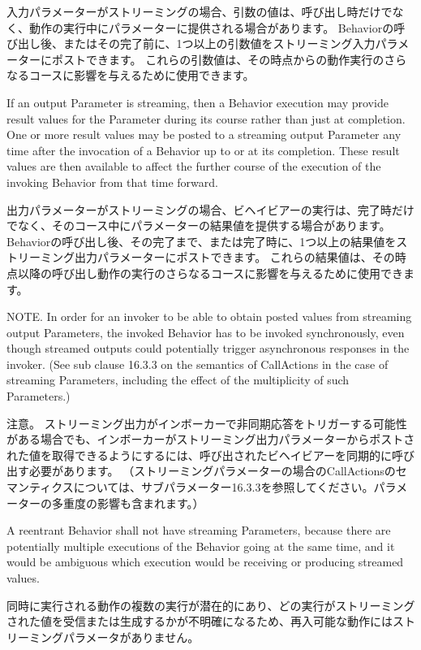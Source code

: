 \documentclass[a4paper,11pt]{ltjsarticle}
\begin{document}
入力パラメーターがストリーミングの場合、引数の値は、呼び出し時だけでなく、動作の実行中にパラメーターに提供される場合があります。
Behaviorの呼び出し後、またはその完了前に、1つ以上の引数値をストリーミング入力パラメーターにポストできます。 
これらの引数値は、その時点からの動作実行のさらなるコースに影響を与えるために使用できます。

If an output Parameter is streaming, then a Behavior execution may provide result values for the Parameter during its course rather than just at completion. 
One or more result values may be posted to a streaming output Parameter any time after the invocation of a Behavior up to or at its completion. 
These result values are then available to affect the further course of the execution of the invoking Behavior from that time forward.

出力パラメーターがストリーミングの場合、ビヘイビアーの実行は、完了時だけでなく、そのコース中にパラメーターの結果値を提供する場合があります。
Behaviorの呼び出し後、その完了まで、または完了時に、1つ以上の結果値をストリーミング出力パラメーターにポストできます。
これらの結果値は、その時点以降の呼び出し動作の実行のさらなるコースに影響を与えるために使用できます。

NOTE. In order for an invoker to be able to obtain posted values from streaming output Parameters, the invoked Behavior has to be invoked synchronously, even though streamed outputs could potentially trigger asynchronous responses in the invoker. 
(See sub clause 16.3.3 on the semantics of CallActions in the case of streaming Parameters, including the effect of the multiplicity of such Parameters.)

注意。 ストリーミング出力がインボーカーで非同期応答をトリガーする可能性がある場合でも、インボーカーがストリーミング出力パラメーターからポストされた値を取得できるようにするには、呼び出されたビヘイビアーを同期的に呼び出す必要があります。
（ストリーミングパラメーターの場合のCallActionsのセマンティクスについては、サブパラメーター16.3.3を参照してください。パラメーターの多重度の影響も含まれます。）

A reentrant Behavior shall not have streaming Parameters, because there are potentially multiple executions of the Behavior going at the same time, and it would be ambiguous which execution would be receiving or producing streamed values.

同時に実行される動作の複数の実行が潜在的にあり、どの実行がストリーミングされた値を受信または生成するかが不明確になるため、再入可能な動作にはストリーミングパラメータがありません。
\end{document}

